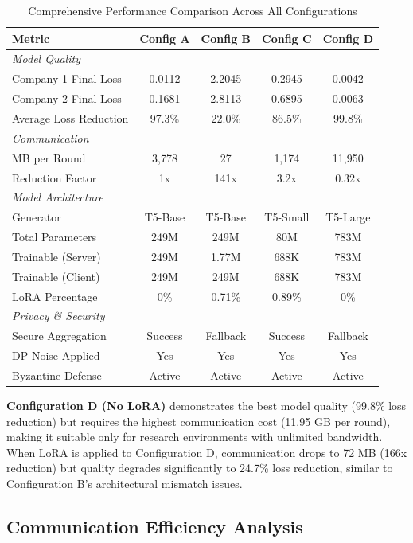 \documentclass[conference]{IEEEtran}
\begin{document}
\begin{table}[h]
\centering
\caption{Comprehensive Performance Comparison Across All Configurations}
\label{tab:performance_summary}
\begin{tabular}{@{}lcccc@{}}
\toprule
\textbf{Metric} & \textbf{Config A} & \textbf{Config B} & \textbf{Config C} & \textbf{Config D} \\
\midrule
\textit{Model Quality} & & & & \\
Company 1 Final Loss & 0.0112 & 2.2045 & 0.2945 & 0.0042 \\
Company 2 Final Loss & 0.1681 & 2.8113 & 0.6895 & 0.0063 \\
Average Loss Reduction & 97.3\% & 22.0\% & 86.5\% & 99.8\% \\
\midrule
\textit{Communication} & & & & \\
MB per Round & 3,778 & 27 & 1,174 & 11,950 \\
Reduction Factor & 1x & 141x & 3.2x & 0.32x \\
\midrule
\textit{Model Architecture} & & & & \\
Generator & T5-Base & T5-Base & T5-Small & T5-Large \\
Total Parameters & 249M & 249M & 80M & 783M \\
Trainable (Server) & 249M & 1.77M & 688K & 783M \\
Trainable (Client) & 249M & 249M & 688K & 783M \\
LoRA Percentage & 0\% & 0.71\% & 0.89\% & 0\% \\
\midrule
\textit{Privacy \& Security} & & & & \\
Secure Aggregation & Success & Fallback & Success & Fallback \\
DP Noise Applied & Yes & Yes & Yes & Yes \\
Byzantine Defense & Active & Active & Active & Active \\
\bottomrule
\end{tabular}
\end{table}

\textbf{Configuration D (No LoRA)} demonstrates the best model quality (99.8\% loss reduction) but requires the highest communication cost (11.95 GB per round), making it suitable only for research environments with unlimited bandwidth. When LoRA is applied to Configuration D, communication drops to 72 MB (166x reduction) but quality degrades significantly to 24.7\% loss reduction, similar to Configuration B's architectural mismatch issues.

\subsection{Communication Efficiency Analysis}
\end{document}
